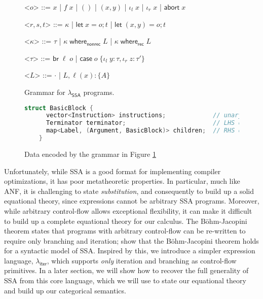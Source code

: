 \documentclass[acmsmall,screen,review]{acmart}
\newcommand{\ms}[1]{\ensuremath{\mathsf{#1}}}
\newcommand{\lto}{:}
\newcommand{\linl}[1]{\iota_l\;{#1}}
\newcommand{\linr}[1]{\iota_r\;{#1}}
\newcommand{\labort}[1]{\ms{abort}\;{#1}}
\newcommand{\letstmt}[3]{\ensuremath{\ms{let}\;#1 = #2; #3}}
\newcommand{\brb}[2]{\ms{br}\;#1\;#2}
\newcommand{\casestmt}[5]{\ms{case}\;#1\;\{\linl{#2} \lto #3, \linr{#4} \lto #5\}}
\newcommand{\awhere}[2]{#1\;\ms{where}_{\ms{nonrec}}\;#2}
\newcommand{\cwhere}[2]{#1\;\ms{where}_{\ms{rec}}\;#2}
\newcommand{\wbranch}[3]{#1(#2) \lto \{#3\}}
\newcommand{\subiterexp}{\texorpdfstring{\(\lambda_{\ms{iter}}\)}{lambda-iter}}
\newcommand{\isotopessa}{\(\lambda_{\ms{SSA}}\)}
\begin{document}
\begin{figure}
  \begin{grammar}
    <\(o\)> ::= \(x\)
      \;|\; \(f\;x\)
      \;|\; \(()\)
      \;|\; \((x, y)\)
      \;|\;  \(\linl{x}\)
      \;|\; \(\linr{x}\)
      \;|\; \(\labort{x}\)

    <\(r, s, t\)> ::= \(\kappa\)
      \;|\; \(\letstmt{x}{o}{t}\)
      \;|\; \(\letstmt{(x, y)}{o}{t}\)

    <\(\kappa\)> ::= \(\tau\) \;|\; \(\awhere{\kappa}{L}\) \;|\; \(\cwhere{\kappa}{L}\)

    <\(\tau\)> ::= \(\brb{\ell}{o}\)
      \;|\; \(\casestmt{o}{y}{\tau}{z}{\tau'}\)

    <\(L\)> ::= \(\cdot\) \;|\; \(L, \wbranch{\ell}{x}{A}\)
  \end{grammar}
  \caption{Grammar for \isotopessa{} programs.}
  \Description{}
  \label{fig:ssa-syntax}
\end{figure}

\begin{figure}
  \begin{lstlisting}[language=C++]
    struct BasicBlock {
      vector<Instruction> instructions;             // unary/binary let-bindings
      Terminator terminator;                        // LHS of where-block
      map<Label, (Argument, BasicBlock)> children;  // RHS of where-block
    }
  \end{lstlisting}
  \caption{Data encoded by the grammar in Figure \ref{fig:ssa-syntax}}
  \Description{}
  \label{fig:ssa-data}
\end{figure}

Unfortunately, while SSA is a good format for implementing compiler optimizations, it has poor
metatheoretic properties. In particular, much like ANF, it is challenging to state
\emph{substitution}, and consequently to build up a solid equational theory, since expressions
cannot be arbitrary SSA programs. Moreover, while arbitrary control-flow allows exceptional
flexibility, it can make it difficult to build up a complete equational theory for our calculus. The
B\"ohm-Jacopini theorem states that programs with arbitrary control-flow can be re-written to
require only branching and iteration; \citet{ghalayini-24-ssa-densem-arxiv} show that the
B\"ohm-Jacopini theorem holds for a syntactic model of SSA. Inspired by this, we introduce a simpler
expression language, \subiterexp{}, which supports \emph{only} iteration and branching as
control-flow primitives. In a later section, we will show how to recover the full generality of SSA
from this core language, which we will use to state our equational theory and build up our
categorical semantics.
\end{document}
